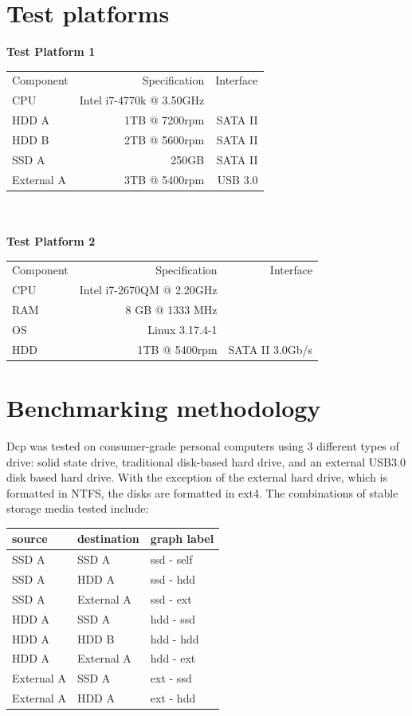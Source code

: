 \documentclass[12pt]{article}
\begin{document}
\section {Test platforms}
\textbf{Test Platform 1}\\
\begin{tabular}{|l|r r|}
  \hline
  Component & Specification                   & Interface \\
  CPU       & Intel i7-4770k @ 3.50GHz        &           \\
  HDD A     &         1TB @ 7200rpm           & SATA II   \\
  HDD B     &                 2TB @ 5600rpm   & SATA II   \\
  SSD A     &         250GB                   & SATA II   \\
  External A& 3TB @ 5400rpm                   & USB 3.0   \\
  \hline
\end{tabular}\\\\
\textbf{Test Platform 2}\\
\begin{tabular}{|l|r r|}
  \hline
  Component & Specification                   & Interface \\
  CPU       & Intel i7-2670QM @ 2.20GHz       &           \\
  RAM       & 8 GB @ 1333 MHz                 &           \\
  OS        & Linux 3.17.4-1                  &           \\
  HDD       & 1TB @ 5400rpm                   & SATA II 3.0Gb/s  \\
  \hline
\end{tabular}
\section{Benchmarking methodology}
Dcp was tested on consumer-grade personal computers using 3 different types
of drive: solid state drive, traditional disk-based hard drive, and
an external USB3.0 disk based hard drive. With the exception of the external
hard drive, which is formatted in NTFS, the disks are formatted in ext4.
The combinations of stable storage media tested include:\\
\begin{tabular}{|l|l|l|}
  \hline
  source  & destination & graph label \\
  \hline
  SSD A   & SSD A       & ssd - self  \\
  SSD A   & HDD A       & ssd - hdd   \\
  SSD A   & External A  & ssd - ext   \\
  HDD A   & SSD A       & hdd - ssd   \\
  HDD A   & HDD B       & hdd - hdd   \\
  HDD A   & External A  & hdd - ext   \\
  External A & SSD A    & ext - ssd   \\
  External A & HDD A    & ext - hdd   \\
  \hline
\end{tabular} \\\\
\end{document}
